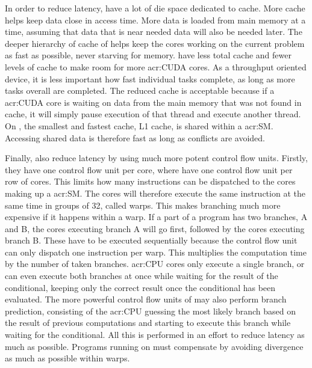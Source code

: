 In order to reduce latency,  have a lot of die space dedicated to cache. More
cache helps keep data close in access time. More data is loaded from main memory at a time, assuming
that data that is near needed data will also be needed later. The deeper hierarchy of cache of
 helps keep the cores working on the current problem as fast as possible, never
starving for memory.  have less total cache and fewer levels of cache to make
room for more \acrshort{acr:CUDA} cores. As a throughput oriented device, it is less important how
fast individual tasks complete, as long as more tasks overall are completed. The reduced cache is
acceptable because if a \acrshort{acr:CUDA} core is waiting on data from the main memory that was
not found in cache, it will simply pause execution of that thread and execute another thread. On
, the smallest and fastest cache, L1 cache, is shared within a
\acrshort{acr:SM}. Accessing shared data is therefore fast as long as conflicts are avoided.

Finally,  also reduce latency by using much more potent control flow units.
Firstly, they have one control flow unit per core, where  have one control flow
unit per row of cores. This limits how many instructions can be dispatched to the cores making up a
\acrshort{acr:SM}. The cores will therefore execute the same instruction at the same time in groups
of 32, called warps. This makes branching much more expensive if it happens within a warp. If a part
of a program has two branches, A and B, the cores executing branch A will go first, followed by the
cores executing branch B. These have to be executed sequentially because the control flow unit can
only dispatch one instruction per warp. This multiplies the computation time by the number of taken
branches. \Acrshort{acr:CPU} cores only execute a single branch, or can even execute both branches
at once while waiting for the result of the conditional, keeping only the correct result once the
conditional has been evaluated. The more powerful control flow units of  may
also perform branch prediction, consisting of the \acrshort{acr:CPU} guessing the most likely branch
based on the result of previous computations and starting to execute this branch while waiting for
the conditional. All this is performed in an effort to reduce latency as much as possible. Programs
running on  must compensate by avoiding divergence as much as possible within
warps.


